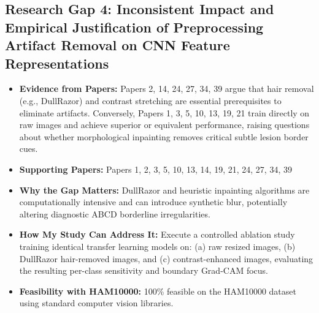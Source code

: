 \documentclass[11pt,a4paper]{article}
\begin{document}
\subsection{Research Gap 4: Inconsistent Impact and Empirical Justification of Preprocessing Artifact Removal on CNN Feature Representations}
\begin{itemize}
\item \textbf{Evidence from Papers:} Papers 2, 14, 24, 27, 34, 39 argue that hair removal (e.g., DullRazor) and contrast stretching are essential prerequisites to eliminate artifacts. Conversely, Papers 1, 3, 5, 10, 13, 19, 21 train directly on raw images and achieve superior or equivalent performance, raising questions about whether morphological inpainting removes critical subtle lesion border cues.
\item \textbf{Supporting Papers:} Papers 1, 2, 3, 5, 10, 13, 14, 19, 21, 24, 27, 34, 39
\item \textbf{Why the Gap Matters:} DullRazor and heuristic inpainting algorithms are computationally intensive and can introduce synthetic blur, potentially altering diagnostic ABCD borderline irregularities.
\item \textbf{How My Study Can Address It:} Execute a controlled ablation study training identical transfer learning models on: (a) raw resized images, (b) DullRazor hair-removed images, and (c) contrast-enhanced images, evaluating the resulting per-class sensitivity and boundary Grad-CAM focus.
\item \textbf{Feasibility with HAM10000:} 100\% feasible on the HAM10000 dataset using standard computer vision libraries.
\end{itemize}
\end{document}
